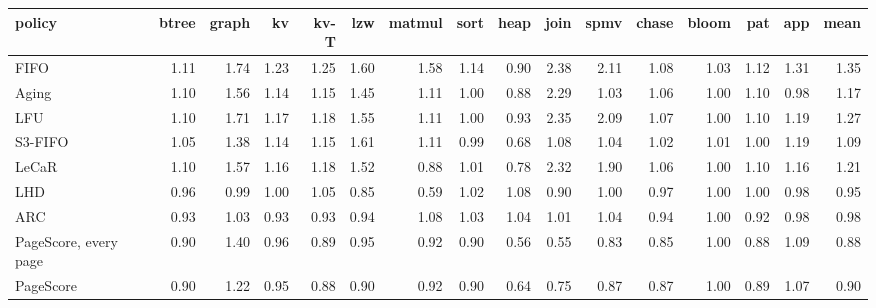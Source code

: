 \begin{tabular}{lrrrrrrrrrrrrrrr}
\toprule
policy & btree & graph & kv & kv-T & lzw & matmul & sort & heap & join & spmv & chase & bloom & pat & app & mean \\
\midrule
FIFO & 1.11 & 1.74 & 1.23 & 1.25 & 1.60 & 1.58 & 1.14 & 0.90 & 2.38 & 2.11 & 1.08 & 1.03 & 1.12 & 1.31 & 1.35 \\
Aging & 1.10 & 1.56 & 1.14 & 1.15 & 1.45 & 1.11 & 1.00 & 0.88 & 2.29 & 1.03 & 1.06 & 1.00 & 1.10 & 0.98 & 1.17 \\
LFU & 1.10 & 1.71 & 1.17 & 1.18 & 1.55 & 1.11 & 1.00 & 0.93 & 2.35 & 2.09 & 1.07 & 1.00 & 1.10 & 1.19 & 1.27 \\
S3-FIFO & 1.05 & 1.38 & 1.14 & 1.15 & 1.61 & 1.11 & 0.99 & 0.68 & 1.08 & 1.04 & 1.02 & 1.01 & 1.00 & 1.19 & 1.09 \\
LeCaR & 1.10 & 1.57 & 1.16 & 1.18 & 1.52 & 0.88 & 1.01 & 0.78 & 2.32 & 1.90 & 1.06 & 1.00 & 1.10 & 1.16 & 1.21 \\
LHD & 0.96 & 0.99 & 1.00 & 1.05 & 0.85 & 0.59 & 1.02 & 1.08 & 0.90 & 1.00 & 0.97 & 1.00 & 1.00 & 0.98 & 0.95 \\
ARC & 0.93 & 1.03 & 0.93 & 0.93 & 0.94 & 1.08 & 1.03 & 1.04 & 1.01 & 1.04 & 0.94 & 1.00 & 0.92 & 0.98 & 0.98 \\
PageScore, every page & 0.90 & 1.40 & 0.96 & 0.89 & 0.95 & 0.92 & 0.90 & 0.56 & 0.55 & 0.83 & 0.85 & 1.00 & 0.88 & 1.09 & 0.88 \\
PageScore & 0.90 & 1.22 & 0.95 & 0.88 & 0.90 & 0.92 & 0.90 & 0.64 & 0.75 & 0.87 & 0.87 & 1.00 & 0.89 & 1.07 & 0.90 \\
\bottomrule
\end{tabular}
